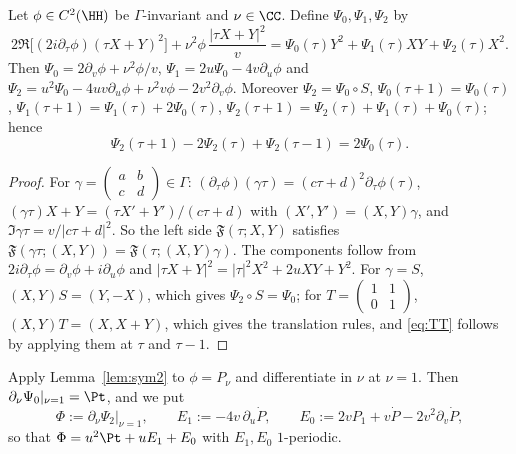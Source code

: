 \begin{lemma}\label{lem:sym2}
Let $\phi\in C^2(\HH)$ be $\Gamma$-invariant and $\nu\in\CC$. Define $\Psi_0,\Psi_1,\Psi_2$ by
\[
2\Re\big[(2i\partial_\tau\phi)(\tau X+Y)^2\big]+\nu^2\phi\,\frac{|\tau X+Y|^2}v=\Psi_0(\tau)Y^2+\Psi_1(\tau)XY+\Psi_2(\tau)X^2 .
\]
Then $\Psi_0=2\partial_v\phi+\nu^2\phi/v$, $\Psi_1=2u\Psi_0-4v\partial_u\phi$ and $\Psi_2=u^2\Psi_0-4uv\partial_u\phi+\nu^2v\phi-2v^2\partial_v\phi$. Moreover
$\Psi_2=\Psi_0\circ S$, $\Psi_0(\tau+1)=\Psi_0(\tau)$, $\Psi_1(\tau+1)=\Psi_1(\tau)+2\Psi_0(\tau)$, $\Psi_2(\tau+1)=\Psi_2(\tau)+\Psi_1(\tau)+\Psi_0(\tau)$; hence
\begin{equation}\label{eq:TT}
\Psi_2(\tau+1)-2\Psi_2(\tau)+\Psi_2(\tau-1)=2\Psi_0(\tau).
\end{equation}
\end{lemma}

\begin{proof}
For $\gamma=\left(\begin{smallmatrix}a&b\\c&d\end{smallmatrix}\right)\in\Gamma$: $(\partial_\tau\phi)(\gamma\tau)=(c\tau+d)^2\partial_\tau\phi(\tau)$, $(\gamma\tau)X+Y=(\tau X'+Y')/(c\tau+d)$
with $(X',Y')=(X,Y)\gamma$, and $\Im\gamma\tau=v/|c\tau+d|^2$. So the left side $\mathfrak F(\tau;X,Y)$ satisfies
$\mathfrak F(\gamma\tau;(X,Y))=\mathfrak F(\tau;(X,Y)\gamma)$. The components follow from $2i\partial_\tau\phi=\partial_v\phi+i\partial_u\phi$ and
$|\tau X+Y|^2=|\tau|^2X^2+2uXY+Y^2$. For $\gamma=S$, $(X,Y)S=(Y,-X)$, which gives $\Psi_2\circ S=\Psi_0$; for
$T=\left(\begin{smallmatrix}1&1\\0&1\end{smallmatrix}\right)$, $(X,Y)T=(X,X+Y)$, which gives the translation rules, and \eqref{eq:TT} follows by
applying them at $\tau$ and $\tau-1$.
\end{proof}

Apply Lemma~\ref{lem:sym2} to $\phi=P_\nu$ and differentiate in $\nu$ at $\nu=1$. Then $\partial_\nu\Psi_0|_{\nu=1}=\Pt$, and we put
\begin{equation}\label{eq:Phi}
\Phi:=\partial_\nu\Psi_2\big|_{\nu=1},\qquad E_1:=-4v\,\partial_u\dot P,\qquad E_0:=2vP_1+v\dot P-2v^2\partial_v\dot P,
\end{equation}
so that $\Phi=u^2\Pt+uE_1+E_0$ with $E_1,E_0$ $1$-periodic.


